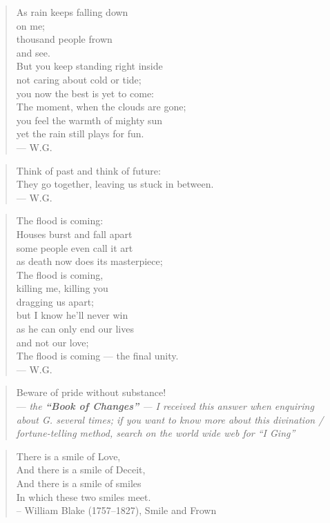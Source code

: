 \begin{verse}
As rain keeps falling down\\
on me;\\
thousand people frown\\
and see.\\
But you keep standing right inside\\
not caring about cold or tide;\\
you now the best is yet to come:\\
The moment, when the clouds are gone;\\
you feel the warmth of mighty sun\\
yet the rain still plays for fun. \\
--- W.G.
\end{verse}

\begin{verse}
Think of past and think of future:\\
They go together, leaving us stuck in between.\\
--- W.G.
\end{verse}

\begin{verse}
The flood is coming:\\
Houses burst and fall apart\\
some people even call it art\\
as death now does its masterpiece;\\
The flood is coming,\\
killing me, killing you\\
dragging us apart;\\
but I know he'll never win\\
as he can only end our lives\\
and not our love;\\
The flood is coming --- the final unity.\\
--- W.G.
\end{verse}

\begin{quote}
Beware of pride without substance!\\
--- \emph{the \textbf{\enquote{Book of Changes}} --- I received this answer when enquiring about G. several times; if you want to know more about this divination / fortune-telling method, search on the world wide web for \enquote{I Ging}}
\end{quote}

\begin{verse}
There is a smile of Love,\\
And there is a smile of Deceit,\\
And there is a smile of smiles\\
In which these two smiles meet.\\
-- William Blake (1757--1827), Smile and Frown
\end{verse}


